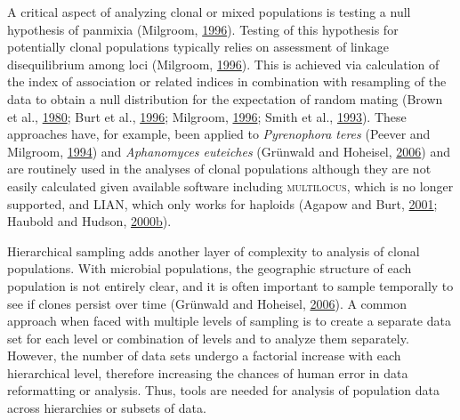 \documentclass[double,12pt]{beavtex}
\begin{document}
  A critical aspect of analyzing clonal or mixed populations is testing a
  null hypothesis of panmixia (Milgroom,
  \protect\hyperlink{ref-milgroom1996recombination}{1996}). Testing of
  this hypothesis for potentially clonal populations typically relies on
  assessment of linkage disequilibrium among loci (Milgroom,
  \protect\hyperlink{ref-milgroom1996recombination}{1996}). This is
  achieved via calculation of the index of association or related indices
  in combination with resampling of the data to obtain a null distribution
  for the expectation of random mating (Brown et al.,
  \protect\hyperlink{ref-brown1980multilocus}{1980}; Burt et al.,
  \protect\hyperlink{ref-burt1996molecular}{1996}; Milgroom,
  \protect\hyperlink{ref-milgroom1996recombination}{1996}; Smith et al.,
  \protect\hyperlink{ref-smith1993how}{1993}). These approaches have, for
  example, been applied to \emph{Pyrenophora teres} (Peever and Milgroom,
  \protect\hyperlink{ref-peever1994genetic}{1994}) and \emph{Aphanomyces
  euteiches} (Grünwald and Hoheisel,
  \protect\hyperlink{ref-grunwald2006hierarchical}{2006}) and are
  routinely used in the analyses of clonal populations although they are
  not easily calculated given available software including
  \textsc{multilocus}, which is no longer supported, and \textsc{LIAN},
  which only works for haploids (Agapow and Burt,
  \protect\hyperlink{ref-Agapow_2001}{2001}; Haubold and Hudson,
  \protect\hyperlink{ref-Haubold:2000}{2000}\protect\hyperlink{ref-Haubold:2000}{b}).
  
  Hierarchical sampling adds another layer of complexity to analysis of
  clonal populations. With microbial populations, the geographic structure
  of each population is not entirely clear, and it is often important to
  sample temporally to see if clones persist over time (Grünwald and
  Hoheisel, \protect\hyperlink{ref-grunwald2006hierarchical}{2006}). A
  common approach when faced with multiple levels of sampling is to create
  a separate data set for each level or combination of levels and to
  analyze them separately. However, the number of data sets undergo a
  factorial increase with each hierarchical level, therefore increasing
  the chances of human error in data reformatting or analysis. Thus, tools
  are needed for analysis of population data across hierarchies or subsets
  of data.
  
\end{document}
